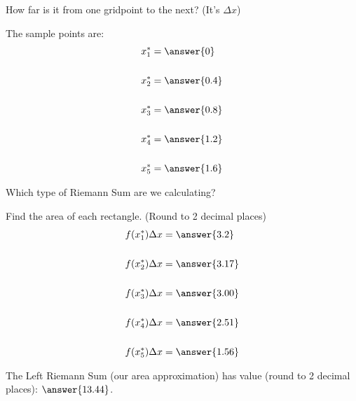\documentclass{ximera}
\begin{document}
\begin{exercise}
\begin{exercise}
\begin{exercise}
\begin{hint}
				How far is it from one gridpoint to the next?  (It's $\Delta x$)
			\end{hint}
			\begin{exercise}
				The sample points are:
				\begin{align*}
					x_1^* &= \answer{0} \\ \\
					x_2^* &= \answer{0.4} \\ \\
					x_3^* &= \answer{0.8} \\ \\
					x_4^* &= \answer{1.2} \\ \\
					x_5^* &= \answer{1.6}
				\end{align*}
				\begin{hint}
					Which type of Riemann Sum are we calculating?
				\end{hint}

				\begin{exercise}
					Find the area of each rectangle. (Round to 2 decimal places)
					\begin{align*}
						f(x_1^*)\Delta x &= \answer{3.2} \\ \\
						f(x_2^*)\Delta x &= \answer{3.17} \\ \\
						f(x_3^*)\Delta x &= \answer{3.00} \\ \\
						f(x_4^*)\Delta x &= \answer{2.51} \\ \\
						f(x_5^*)\Delta x &= \answer{1.56}
					\end{align*}
				
					\begin{exercise}
						The Left Riemann Sum (our area approximation) has value (round to 2 decimal places):
						$\answer{13.44}$.
					\end{exercise}
					
				\end{exercise}
			\end{exercise}			
		\end{exercise}
	\end{exercise}

\end{exercise}
\end{document}
